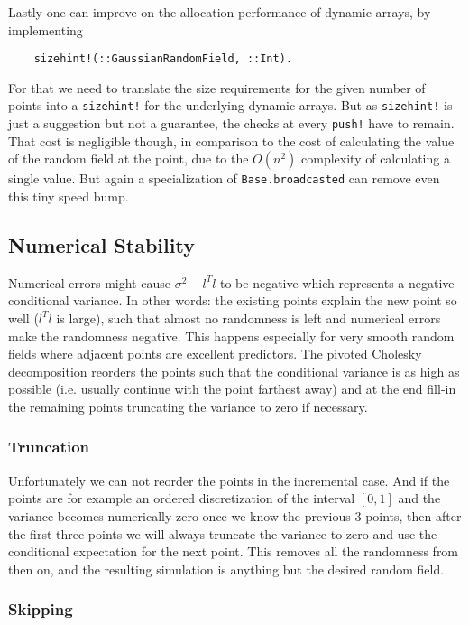 Lastly one can improve on the allocation performance of dynamic arrays, by implementing
\begin{verbatim}
	sizehint!(::GaussianRandomField, ::Int).
\end{verbatim}
For that we need to translate the size requirements for the given number of
points into a \texttt{sizehint!} for the underlying dynamic arrays.
But as \texttt{sizehint!} is just a suggestion but not a guarantee,
the checks at every \texttt{push!} have to remain. That
cost is negligible though, in comparison to the cost of calculating the
value of the random field at the point, due to the \(O(n^2)\) complexity of
calculating a single value. But again a specialization of
\texttt{Base.broadcasted} can remove even this tiny speed bump.

\subsection{Numerical Stability}

Numerical errors might cause \(\sigma^2 - l^T l\) to be negative which
represents a negative conditional variance. In other words: the existing points
explain the new point so well (\(l^Tl\) is large), such that almost no
randomness is left and numerical errors make the randomness negative. This
happens especially for very smooth random fields where adjacent points are
excellent predictors. The pivoted Cholesky decomposition reorders the points
such that the conditional variance is as high as possible (i.e. usually continue
with the point farthest away) and at the end fill-in the remaining points
truncating the variance to zero if necessary.

\subsubsection{Truncation}

Unfortunately we can not reorder the points in the incremental case. And if the
points are for example an ordered discretization of the interval \([0,1]\) and
the variance becomes numerically zero once we know the previous \(3\) points,
then after the first three points we will always truncate the variance to zero
and use the conditional expectation for the next point. This removes all the
randomness from then on, and the resulting simulation is anything but the desired
random field.

\subsubsection{Skipping}

